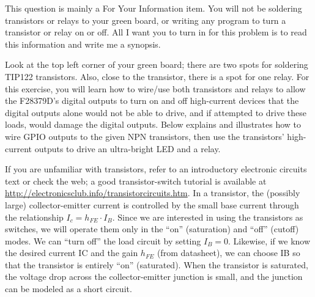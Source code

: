 \documentclass[11pt]{article}
\begin{document}
This question is mainly a For Your Information item. You will not be soldering transistors or relays to your green board, or writing any program to turn a transistor or relay on or off. All I want you to turn in for this problem is to read this information and write me a synopsis.

Look at the top left corner of your green board; there are two spots for soldering TIP122 transistors. Also, close to the transistor, there is a spot for one relay. For this exercise, you will learn how to wire/use both transistors and relays to allow the F28379D’s digital outputs to turn on and off high-current devices that the digital outputs alone would not be able to drive, and if attempted to drive these loads, would damage the digital outputs. Below explains and illustrates how to wire GPIO outputs to the given NPN transistors, then use the transistors' high-current outputs to drive an ultra-bright LED and a relay.

If you are unfamiliar with transistors, refer to an introductory electronic circuits text or check the web; a good transistor-switch tutorial is available at \url{http://electronicsclub.info/transistorcircuits.htm}. In a transistor, the (possibly large) collector-emitter current is controlled by the small base current through the relationship $I_c=h_{FE} \cdot I_B$. Since we are interested in using the transistors as switches, we will operate them only in the “on” (saturation) and “off” (cutoff) modes. We can “turn off” the load circuit by setting $I_B = 0$. Likewise, if we know the desired current IC and the gain $h_{FE}$ (from datasheet), we can choose IB so that the transistor is entirely “on” (saturated). When the transistor is saturated, the voltage drop across the collector-emitter junction is small, and the junction can be modeled as a short circuit.
\end{document}

